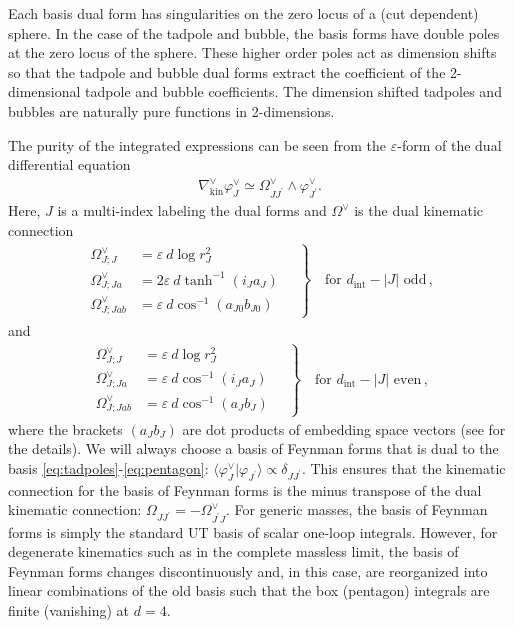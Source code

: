 \documentclass[11pt]{article}
\newcommand{\la}{\langle}
\newcommand{\ra}{\rangle}
\newcommand{\dint}{d_\text{int}}
\newcommand{\vphi}{\varphi}
\newcommand{\vep}{\varepsilon}
\begin{document}
Each basis dual form has singularities on the zero locus of a (cut dependent) sphere. In the case of the tadpole and bubble, the basis forms have double poles at the zero locus of the sphere. These higher order poles act as dimension shifts so that the tadpole and bubble dual forms extract the coefficient of the 2-dimensional tadpole and bubble coefficients. The dimension shifted tadpoles and bubbles are naturally pure functions in 2-dimensions. 

The purity of the integrated expressions can be seen from the $\vep$-form of the dual differential equation \cite{Caron-Huot:2021xqj}
\begin{align}
	\nabla^\vee_{\text{kin}} \vphi^\vee_J 
	\simeq \Omega_{JJ^\prime}^\vee \wedge \vphi^\vee_{J^\prime}. 
\end{align}
Here, $J$ is a multi-index labeling the dual forms and $\Omega^\vee$ is the dual kinematic connection
\begin{align} \label{eq:oddOmega}
\left.\begin{array}{ll} \displaystyle
	\Omega_{J;J}^\vee 	&= \vep\ d\log r_J^2
	\\[0.1em]\displaystyle
	\Omega_{J;Ja}^\vee &=
		2\vep\ d\tanh^{-1}(i_J a_J)
	\\[0.1em]\displaystyle
	\Omega_{J;Jab}^\vee  &= \vep\ d\cos^{-1}(a_{J0}b_{J0})
\end{array}
\quad\right\}\quad	\text{for } \dint-|J| \text{ odd}\,,
\end{align}
and 
\begin{align} \label{eq:evenOmega}
\left.\begin{array}{ll} \displaystyle
	\Omega_{J;J}^\vee 
		&=\vep\ d\log r_J^2
	\\[0.1em]\displaystyle
	\Omega_{J;Ja}^\vee 
		&= \vep\ d\cos^{-1}(i_{J}a_{J})
	\\[0.1em]\displaystyle
	\Omega_{J;Jab}^\vee
	&=\vep\ d\cos^{-1}(a_{J}b_{J})
\end{array}
\quad\right\}\quad \text{for } \dint-|J| \text{ even}\,,	
\end{align}
where the brackets $(a_J b_J)$ are dot products of embedding space vectors (see \cite{Caron-Huot:2021xqj} for the details). We will always choose a basis of Feynman forms that is dual to the basis \eqref{eq:tadpoles}-\eqref{eq:pentagon}: $\la \vphi^\vee_J \vert \vphi_{J^\prime} \ra \propto \delta_{JJ^\prime}$. This ensures that the kinematic connection for the basis of Feynman forms is the minus transpose of the dual kinematic connection: $\Omega_{JJ^\prime} = -\Omega^\vee_{J^\prime J}$. For generic masses, the basis of Feynman forms is simply the standard UT basis of scalar one-loop integrals. However, for degenerate kinematics such as in the complete massless limit, the basis of Feynman forms changes discontinuously and, in this case, are reorganized into linear combinations of the old basis such that the box (pentagon) integrals are finite (vanishing) at $d=4$. 
\end{document}
